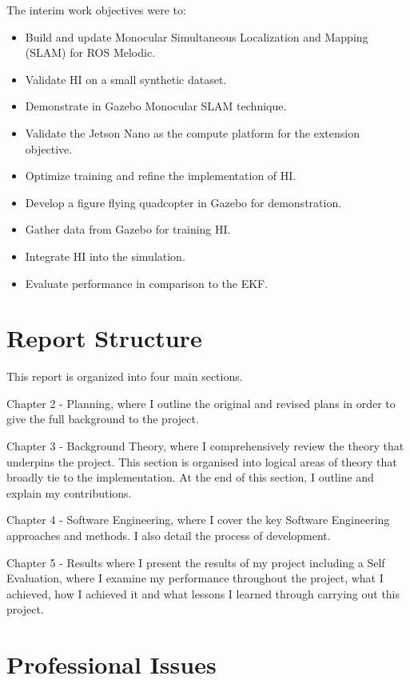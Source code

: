 \documentclass[]{../resources/final_report}
\begin{document}
The interim work objectives were to:
\begin{itemize}
  \item Build and update Monocular Simultaneous Localization and Mapping (SLAM) for ROS Melodic.
  \item Validate HI on a small synthetic dataset.
  \item Demonstrate in Gazebo Monocular SLAM technique.
  \item Validate the Jetson Nano as the compute platform for the extension objective.
  \item Optimize training and refine the implementation of HI.
  \item Develop a figure flying quadcopter in Gazebo for demonstration.
  \item Gather data from Gazebo for training HI.
  \item Integrate HI into the simulation.
  \item Evaluate performance in comparison to the EKF.
\end{itemize}

\section{Report Structure}

This report is organized into four main sections.

Chapter 2 - Planning, where I outline the original and revised plans in order to give the full background to the project. 

Chapter 3 - Background Theory, where I comprehensively review the theory that underpins the project. This section is organised into logical areas of theory that broadly tie to the implementation. At the end of this section, I outline and explain my contributions.

Chapter 4 - Software Engineering, where I cover the key Software Engineering approaches and methods. I also detail the process of development.

Chapter 5 - Results where I present the results of my project including a Self Evaluation, where I examine my performance throughout the project, what I achieved, how I achieved it and what lessons I learned through carrying out this project.

\section{Professional Issues}
\end{document}

